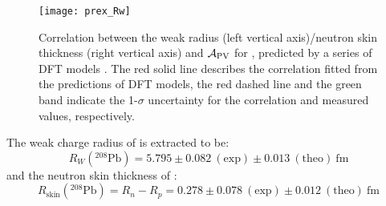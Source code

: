 \begin{figure}[!h]
    \centering
    \texttt{[image: prex\_Rw]}
    \caption[Correlation between the weak radius/neutron skin thickness and Apv]
    {Correlation between the weak radius (left vertical axis)/neutron skin thickness 
    (right vertical axis) and $\mathcal{A}_{\text{PV}}$ for \Pb,
    predicted by a series of DFT models \cite{PhysRevLett.126.172502}. 
    The red solid line describes the correlation fitted from the predictions of
    DFT models, the red dashed line and the green band indicate the 1-$\sigma$ uncertainty for the correlation and measured values, respectively.}
    \label{fig:prex_Rw}
\end{figure}


The weak charge radius of \Pb is extracted to be:
\begin{equation}
    R_W ({}^{208}\text{Pb}) = 5.795 \pm 0.082 \ (\text{exp}) \pm 0.013 \ (\text{theo})\ \mathrm{fm}
\end{equation}
and the neutron skin thickness of \Pb:
\begin{equation}
    R_{\text{skin}} ({}^{208}\text{Pb}) = R_n - R_p = 0.278 \pm 0.078 \ (\text{exp}) \pm 0.012 \ (\text{theo})\ \mathrm{fm}
\end{equation}

